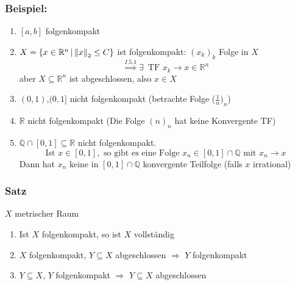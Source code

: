\subsubsection{Beispiel:} %
\label{ssub:beispiel}
\begin{enumerate}
	\item $[a,b]$ folgenkompakt
	\item $X= \{ x \in \mathbb{R}^n \,|\, \norm{x}_2 \leq C \}$ ist folgenkompakt: $(x_k)_k$ Folge in $X$
	\[
		\stackrel{I.5.1}{\Rightarrow } \exists\, \text{ TF } x_k \to x \in \mathbb{R}^n
	\]
	aber $X \subseteq \mathbb{R}^n$ ist abgeschlossen, also $x \in X$
	\item $(0,1)$,$(0,1]$ nicht folgenkompakt (betrachte Folge ($\frac{1}{n})_n$)
	\item $\mathbb{R}$ nicht folgenkompakt (Die Folge $(n)_n$ hat keine Konvergente TF)
	\item $\mathbb{Q} \cap [0,1] \subseteq \mathbb{R}$ nicht folgenkompakt.
	\[
		\text{Ist } x \in [0,1], \text{ so gibt es eine Folge } x_n \in [0,1] \cap \mathbb{Q} \text{ mit } x_n \to x
	\]
	Dann hat $x_n$ keine in $[0,1] \cap \mathbb{Q}$ konvergente Teilfolge (falls $x$ irrational)
\end{enumerate}

\subsubsection{Satz} %
\label{ssub:satz}
$X$ metrischer Raum
\begin{enumerate}
	\item Ist $X$ folgenkompakt, so ist $X$ vollständig
	\item $X$ folgenkompakt, $Y \subseteq X$ abgeschlossen $\Rightarrow$ $Y$ folgenkompakt
	\item $Y \subseteq X$, $Y$ folgenkompakt $\Rightarrow$ $Y \subseteq X$ abgeschlossen
\end{enumerate}

